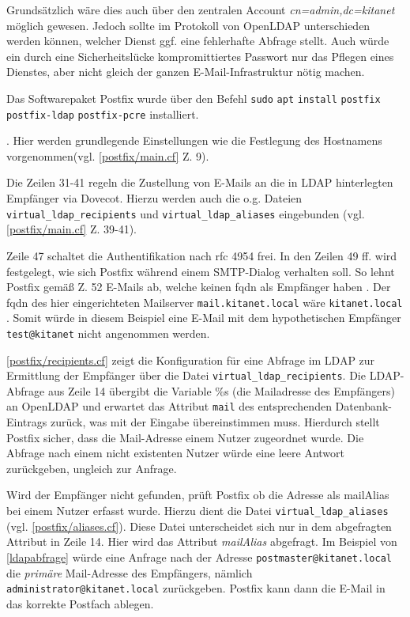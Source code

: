 Grundsätzlich wäre dies auch über den zentralen Account \textit{cn=admin,dc=kitanet} möglich gewesen. 
Jedoch sollte im Protokoll von OpenLDAP unterschieden werden können, welcher Dienst ggf. eine fehlerhafte Abfrage stellt. 
Auch würde ein durch eine Sicherheitslücke kompromittiertes Passwort nur das Pflegen eines Dienstes, aber nicht gleich der ganzen E-Mail-Infrastruktur nötig machen.

Das Softwarepaket Postfix wurde über den Befehl \verb+sudo+ \verb+apt+ \verb+install+ \verb+postfix+ \\ \verb+postfix-ldap+ \verb+postfix-pcre+ installiert. 

 \citep[][308]{Deimeke2019}.
Hier werden grundlegende Einstellungen wie die Festlegung des Hostnamens vorgenommen(vgl. \autoref{postfix/main.cf} Z. 9).

Die Zeilen 31-41 regeln die Zustellung von E-Mails an die in LDAP hinterlegten Empfänger via Dovecot. Hierzu werden auch die o.g. Dateien \verb+virtual_ldap_recipients+ und \verb+virtual_ldap_aliases+ eingebunden (vgl. \autoref{postfix/main.cf} Z. 39-41).

Zeile 47 schaltet die Authentifikation nach \ac{rfc} 4954 frei.
In den Zeilen 49 ff. wird festgelegt, wie sich Postfix während einem SMTP-Dialog verhalten soll.
So lehnt Postfix \zb gemäß Z. 52 E-Mails ab, welche keinen \ac{fqdn} als Empfänger haben \citep[vgl.][]{postfixfqdn}. 
Der \ac{fqdn} des hier eingerichteten Mailserver \verb+mail.kitanet.local+ wäre \zb \verb+kitanet.local+ \citep[vgl.][]{fqdn}. 
Somit würde in diesem Beispiel eine E-Mail mit dem hypothetischen Empfänger \verb+test@kitanet+ nicht angenommen werden.

\autoref{postfix/recipients.cf} zeigt die Konfiguration für eine Abfrage im LDAP zur Ermittlung der Empfänger über die Datei \verb+virtual_ldap_recipients+.
Die LDAP-Abfrage aus Zeile 14 übergibt die Variable \%s (die Mailadresse des Empfängers) an OpenLDAP und erwartet das Attribut \verb+mail+ des entsprechenden Datenbank-Eintrags zurück, was mit der Eingabe übereinstimmen muss. Hierdurch stellt Postfix sicher, dass die Mail-Adresse einem Nutzer zugeordnet wurde. Die Abfrage nach einem nicht existenten Nutzer würde eine leere Antwort zurückgeben, ungleich zur Anfrage.

Wird der Empfänger nicht gefunden, prüft Postfix ob die Adresse als mailAlias bei einem Nutzer erfasst wurde. Hierzu dient die Datei \verb+virtual_ldap_aliases+ (vgl. \autoref{postfix/aliases.cf}). 
Diese Datei unterscheidet sich nur in dem abgefragten Attribut in Zeile 14. 
Hier wird das Attribut \textit{mailAlias} abgefragt. 
Im Beispiel von \autoref{ldapabfrage} würde eine Anfrage nach der Adresse \verb+postmaster@kitanet.local+ die \textit{primäre} Mail-Adresse des Empfängers, nämlich \verb+administrator@kitanet.local+ zurückgeben. 
Postfix kann dann die E-Mail in das korrekte Postfach ablegen.

